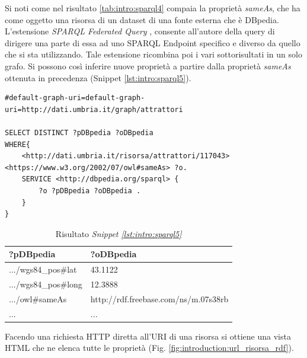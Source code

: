 Si noti come nel risultato \ref{tab:intro:sparql4} compaia la proprietà \textit{sameAs}, che ha come oggetto una risorsa di un dataset di una fonte esterna che è DBpedia.
L'estensione \textit{SPARQL Federated Query} \cite{SPARQL_FEDERATED_QUERY}, consente all'autore della query di dirigere una parte di essa ad uno SPARQL Endpoint specifico e diverso da quello che si sta utilizzando. Tale estensione ricombina poi i vari sottorisultati in un solo grafo. Si possono così inferire nuove proprietà a partire dalla proprietà \textit{sameAs} ottenuta in precedenza (Snippet \ref{lst:intro:sparql5}).

\begin{lstlisting}[frame=single, caption={Query federata},label={lst:intro:sparql5}]  
#default-graph-uri=default-graph-uri=http://dati.umbria.it/graph/attrattori

SELECT DISTINCT ?pDBpedia ?oDBpedia
WHERE{   
    <http://dati.umbria.it/risorsa/attrattori/117043> <https://www.w3.org/2002/07/owl#sameAs> ?o.
    SERVICE <http://dbpedia.org/sparql> { 
		?o ?pDBpedia ?oDBpedia . 
    } 
}
\end{lstlisting}

\begin{table}[htbp]
\begin{center}
\begin{tabular}{|l|l|}
\hline \textbf{?pDBpedia} & \textbf{?oDBpedia} \\
\hline
.../wgs84\_pos\#lat	& 43.1122\\
\hline
.../wgs84\_pos\#long & 12.3888\\
\hline
.../owl\#sameAs & http://rdf.freebase.com/ns/m.07s38rb\\
\hline
...&...\\
\hline
\end{tabular}
\end{center}
\caption{Risultato \textit{Snippet \ref{lst:intro:sparql5}}}
\label{tab:intro:sparql5}
\end{table}

Facendo una richiesta HTTP diretta all'URI di una risorsa si ottiene una vista HTML che ne elenca tutte le proprietà (Fig. \ref{fig:introduction:url_risorsa_rdf}).

